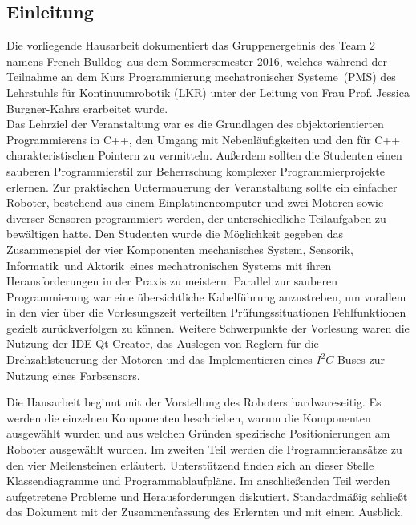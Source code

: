 \documentclass[12pt,a4paper,oneside]{article}
\begin{document}
	\usetikzlibrary{shapes,arrows}
\begin{spacing}{1.15}                       %

	
    \clearpage
    \tableofcontents                        %
    \thispagestyle{empty}
    \clearpage   
	\setcounter{page}{1}
	\section{Einleitung}
	
	Die vorliegende Hausarbeit dokumentiert das Gruppenergebnis des Team 2 namens \glqq French Bulldog\grqq\  aus dem Sommersemester 2016, welches während der Teilnahme an dem Kurs \glqq Programmierung mechatronischer Systeme\grqq\ (PMS) des Lehrstuhls für Kontinuumrobotik (LKR) unter der Leitung von Frau Prof. Jessica Burgner-Kahrs erarbeitet wurde.
	\vspace{2mm}\\
	Das Lehrziel der Veranstaltung war es die Grundlagen des objektorientierten Programmierens in C++, den Umgang mit Nebenläufigkeiten und den für C++ charakteristischen Pointern zu vermitteln. Außerdem sollten die Studenten einen sauberen Programmierstil zur Beherrschung  komplexer Programmierprojekte erlernen. Zur praktischen Untermauerung der Veranstaltung sollte ein einfacher Roboter, bestehend aus einem Einplatinencomputer und zwei Motoren sowie diverser Sensoren programmiert werden, der unterschiedliche Teilaufgaben zu bewältigen hatte. Den Studenten wurde die Möglichkeit gegeben das Zusammenspiel der vier Komponenten \glqq mechanisches System\grqq , \glqq Sensorik\grqq , \glqq Informatik\grqq\  und \glqq Aktorik\grqq\  eines mechatronischen Systems mit ihren Herausforderungen in der Praxis zu meistern. Parallel zur sauberen Programmierung war eine übersichtliche Kabelführung anzustreben, um vorallem in den vier über die Vorlesungszeit verteilten Prüfungssituationen Fehlfunktionen gezielt zurückverfolgen zu können. Weitere Schwerpunkte der Vorlesung waren die Nutzung der IDE Qt-Creator, das Auslegen von Reglern für die Drehzahlsteuerung der Motoren und das Implementieren eines $I^{2}C$-Buses zur Nutzung eines Farbsensors.
	
	Die Hausarbeit beginnt mit der Vorstellung des Roboters hardwareseitig. Es werden die einzelnen Komponenten beschrieben, warum die Komponenten ausgewählt wurden und aus welchen Gründen spezifische Positionierungen am Roboter ausgewählt wurden. Im zweiten Teil werden die Programmieransätze zu den vier Meilensteinen erläutert. Unterstützend finden sich an dieser Stelle Klassendiagramme und Programmablaufpläne. Im anschließenden Teil werden aufgetretene Probleme und Herausforderungen diskutiert. Standardmäßig schließt das Dokument mit der Zusammenfassung des Erlernten und mit einem Ausblick.   
	

\end{spacing}
\end{document}
